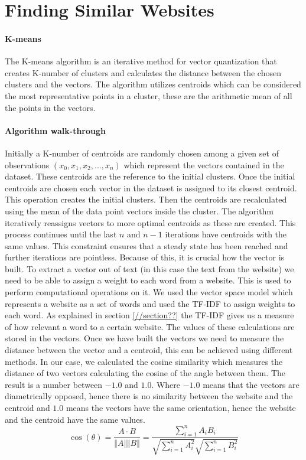 \section{Finding Similar Websites}
\paragraph{K-means}
The K-means algorithm is an iterative method for vector quantization that creates K-number of clusters and calculates the distance between the chosen clusters and the vectors. 
The algorithm utilizes centroids which can be considered the most representative points in a cluster, these are the arithmetic mean of all the points in the vectors.
\paragraph{Algorithm walk-through}
Initially a K-number of centroids are randomly chosen among a given set of observations $(x_0,x_1,x_2,...,x_n)$ which represent the vectors contained in the dataset. These centroids are the reference to the initial clusters. Once the initial centroids are chosen each vector in the dataset is assigned to its closest centroid. This operation creates the initial clusters. Then the centroids are recalculated using the mean of the data point vectors inside the cluster. 
The algorithm iteratively reassigns vectors to more optimal centroids as these are created.\cite{wikiKmeans}
This process continues until the last $n$ and $n-1$ iterations have centroids with the same values. 
This constraint ensures that a steady state has been reached and further iterations are pointless.
Because of this, it is crucial how the vector is built. To extract a vector out of text (in this case the text from the website) we need to be able to assign a weight to each word from a website. This is used to perform computational operations on it. We used the vector space model which represents a website as a set of words and used the TF-IDF to assign weights to each word. As explained in section \ref{//section??} the TF-IDF gives us a measure of how  relevant a word to a certain website. The values of these calculations are stored in the vectors.
Once we have built the vectors we need to measure the distance between the vector and a centroid, this can be achieved using different methods. In our case, we calculated the cosine similarity which measures the distance of two vectors calculating the cosine of the angle between them. The result is a number between $-1.0$ and $1.0$. Where $-1.0$ means that the vectors are diametrically opposed, hence there is no similarity between the website and the centroid and $1.0$ means the vectors have the same orientation, hence the website and the centroid have the same values.\cite{wikiVector}
$$
\cos(\theta) = \frac{A \cdot B}{\Vert A \Vert \Vert B \Vert} = \frac{\sum_{i=1}^n A_iB_i}{\sqrt{\sum_{i=1}^n A_i^2}{\sqrt{\sum_{i=1}^n B_i^2}}}
$$
